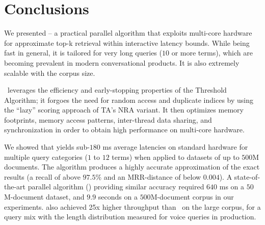 \section{Conclusions}
\label{sec:conclusions}

We presented \alg\/ -- a practical parallel algorithm that exploits multi-core hardware for approximate top-k retrieval 
within interactive latency bounds. While being fast in general, it is tailored for very long queries ($10$ or more terms), which  
are becoming prevalent in modern conversational products.  It is also extremely scalable with the corpus size.

\alg\ leverages the efficiency and early-stopping properties of the Threshold Algorithm; it forgoes the need for random access
and duplicate indices by using the ``lazy'' scoring approach of TA's NRA variant.  It then optimizes memory footprints, memory access 
patterns, inter-thread data sharing, and synchronization in order  to obtain high performance on  multi-core hardware.

We showed that \alg\/ yields sub-$180$ ms average latencies on standard hardware
for multiple query categories ($1$ to $12$ terms) when applied to datasets of up to $500$M documents. The algorithm 
produces a highly accurate approximation of the exact results (a recall of above $97.5\%$ and an MRR-distance of below
$0.004$). A state-of-the-art parallel algorithm (\pBMW) providing similar accuracy required $640$ ms on a $50$M-document dataset, 
and  $9.9$ seconds on a $500$M-document corpus in our experiments. \alg\/ also achieved 25x higher throughput than \pBMW\ 
on the large corpus, for a query mix with the 
length distribution measured for voice queries in production. 

